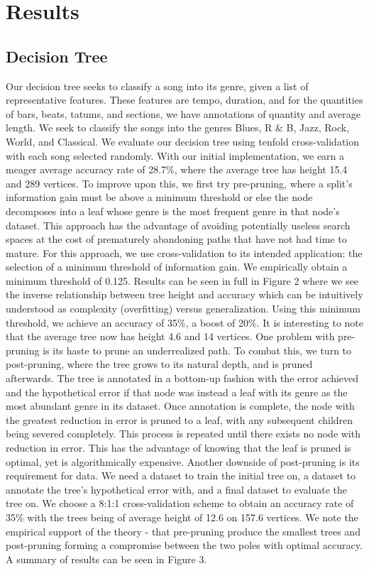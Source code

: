 \documentclass[11pt, twocolumn]{article}
\begin{document}
\section{Results}
\subsection{Decision Tree}
    Our decision tree seeks to classify a song into its genre, given a list of
representative features. These features are tempo, duration, and for the
quantities of bars, beats, tatums, and sections, we have annotations of
quantity and average length. We seek to classify the songs into the genres
Blues, R \& B, Jazz, Rock, World, and Classical. We evaluate our decision tree
using tenfold cross-validation with each song selected randomly. With our
initial implementation, we earn a meager average accuracy rate of 28.7\%, where
the average tree has height 15.4 and 289 vertices.
    To improve upon this, we first try pre-pruning, where a split’s
information gain must be above a minimum threshold or else the node decomposes
into a leaf whose genre is the most frequent genre in that node’s dataset.
This approach has the advantage of avoiding potentially useless search spaces
at the cost of prematurely abandoning paths that have not had time to mature.
For this approach, we use cross-validation to its intended application: the
selection of a minimum threshold of information gain. We empirically obtain a
minimum threshold of 0.125. Results can be seen in full in Figure 2 where we
see the inverse relationship between tree height and accuracy which can be
intuitively understood as complexity (overfitting) versus generalization. Using
this minimum threshold, we achieve an accuracy of 35\%, a boost of 20\%. It is
interesting to note that the average tree now has height 4.6 and 14 vertices.
One problem with pre-pruning is its haste to prune an underrealized path.
    To combat this, we turn to post-pruning, where the tree grows to its
natural depth, and is pruned afterwards. The tree is annotated in a bottom-up
fashion with the error achieved and the hypothetical error if that node was
instead a leaf with its genre as the most abundant genre in its dataset. Once
annotation is complete, the node with the greatest reduction in error is pruned
to a leaf, with any subsequent children being severed completely. This process
is repeated until there exists no node with reduction in error. This has the
advantage of knowing that the leaf is pruned is optimal, yet is algorithmically
expensive. Another downside of post-pruning is its requirement for data. We
need a dataset to train the initial tree on, a dataset to annotate the tree’s
hypothetical error with, and a final dataset to evaluate the tree on. We choose
a 8:1:1 cross-validation scheme to obtain an accuracy rate of 35\% with the
trees being of average height of 12.6 on 157.6 vertices. We note the empirical
support of the theory - that pre-pruning produce the smallest trees and
post-pruning forming a compromise between the two poles with optimal accuracy.
A summary of results can be seen in Figure 3.
\end{document}
